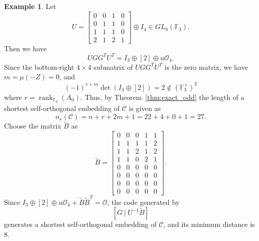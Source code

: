 \documentclass{article}
\theoremstyle{definition}
\newtheorem{example}{Example}[section]
\theoremstyle{remark}
\begin{document}
\begin{example}
    Let
    \[
    U=\begin{bmatrix}
        0 & 0 & 1 & 0\\
        0 & 1 & 1 & 0\\
        1 & 1 & 1 & 0\\
        2 & 1 & 2 & 1
    \end{bmatrix}\oplus I_4\in GL_8(\mathbb{F}_3).
    \]
    Then we have
    \[
    UGG^TU^T=I_3\oplus[2]\oplus u\mathcal{O}_4.
    \]
    Since the bottom-right $4\times 4$ submatrix of $UGG^TU^T$ is the zero matrix, we have $m=\mu(-Z)=0$, and 
    \[
    (-1)^{r+m}\det(I_3\oplus[2])=2\notin (\mathbb{F}_3^\times)^2
    \]
    where $r=\operatorname{rank}_{\mathbb{F}_q}(A_0)$. Thus, by Theorem~\ref{thm:exact_odd} the length of a shortest self-orthogonal embedding of $\mathcal{C}$ is given as
    \[
    n_s(\mathcal{C})=n+r+2m+1=22+4+0+1=27.
    \]
    Choose the matrix $\tilde{B}$ as 
    \[
    \tilde{B} = \begin{bmatrix}
        0 & 0 & 0 & 1 & 1\\
        1 & 1 & 1 & 1 & 2\\
        1 & 1 & 2 & 1 & 2\\
        1 & 1 & 0 & 2 & 1\\
        0 & 0 & 0 & 0 & 0\\
        0 & 0 & 0 & 0 & 0\\
        0 & 0 & 0 & 0 & 0\\
        0 & 0 & 0 & 0 & 0
    \end{bmatrix}.
    \]
    Since $I_3\oplus[2]\oplus u\mathcal{O}_4+\tilde{B}\tilde{B}^T=\mathcal{O}$, the code generated by
    \[
    [G~|~U^{-1}\tilde{B}]
    \]
    generates a shortest self-orthogonal embedding of $\mathcal{C}$, and its minimum distance is 8.


\end{example}
\end{document}
